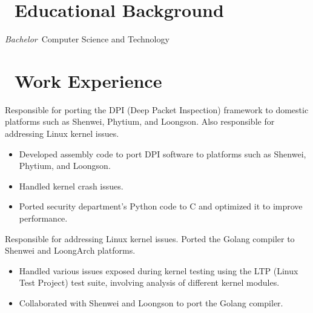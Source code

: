 \documentclass{resume}
\begin{document}


 
\section{\faGraduationCap\ Educational Background}
\textit{Bachelor}\ Computer Science and Technology

\section{\faUsers\ Work Experience}
\begin{onehalfspacing}
  Responsible for porting the DPI (Deep Packet Inspection) framework to domestic platforms such as Shenwei, Phytium, and Loongson. Also responsible for addressing Linux kernel issues.
  \begin{itemize}
  \item Developed assembly code to port DPI software to platforms such as Shenwei, Phytium, and Loongson.
  \item Handled kernel crash issues.
  \item Ported security department's Python code to C and optimized it to improve performance.
  \end{itemize}
\end{onehalfspacing}

\begin{onehalfspacing}
  Responsible for addressing Linux kernel issues. Ported the Golang compiler to Shenwei and LoongArch platforms.
  \begin{itemize}
  \item Handled various issues exposed during kernel testing using the LTP (Linux Test Project) test suite, involving analysis of different kernel modules.
  \item Collaborated with Shenwei and Loongson to port the Golang compiler.
  \end{itemize}
\end{onehalfspacing}
\end{document}
